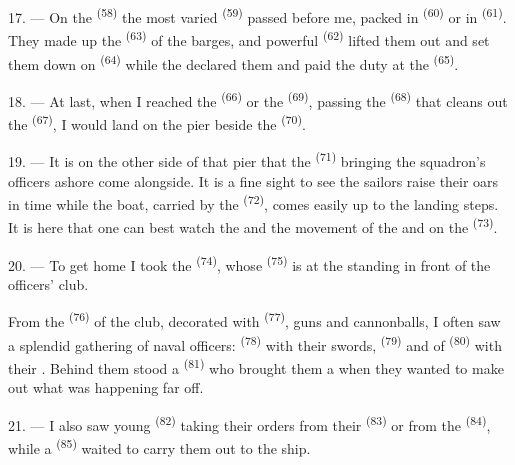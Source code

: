 17. --- On the  \textsuperscript{(58)} the most varied 
\textsuperscript{(59)} passed before me, packed in  \textsuperscript{(60)} or
in  \textsuperscript{(61)}. They made up the  \textsuperscript{(63)}
of the barges, and powerful  \textsuperscript{(62)} lifted them out and
set them down on  \textsuperscript{(64)} while the 
declared them and paid the duty at the  \textsuperscript{(65)}.

18. --- At last, when I reached the  \textsuperscript{(66)} or
the  \textsuperscript{(69)}, passing the  \textsuperscript{(68)}
that cleans out the  \textsuperscript{(67)}, I would land on the pier
beside the  \textsuperscript{(70)}.

19. --- It is on the other side of that pier that the 
\textsuperscript{(71)} bringing the squadron's officers ashore come alongside. It is
a fine sight to see the sailors raise their oars in time while the boat,
carried by the  \textsuperscript{(72)}, comes easily up to the landing
steps. It is here that one can best watch the  and the movement
of the  and  on the  \textsuperscript{(73)}.

\VUsaut{3.0mm}
\VUsaut{3.0mm}

20. --- To get home I took the  \textsuperscript{(74)}, whose
 \textsuperscript{(75)} is at the  standing in front of the
officers' club.

From the  \textsuperscript{(76)} of the club, decorated with
 \textsuperscript{(77)}, guns and cannonballs, I often saw a splendid
gathering of naval officers:  \textsuperscript{(78)} with their
swords,  \textsuperscript{(79)} and of
 \textsuperscript{(80)} with their . Behind them stood
a  \textsuperscript{(81)} who brought them a  when
they wanted to make out what was happening far off.

21. --- I also saw young  \textsuperscript{(82)} taking their
orders from their  \textsuperscript{(83)} or from the
 \textsuperscript{(84)}, while a  \textsuperscript{(85)}
waited to carry them out to the ship.

